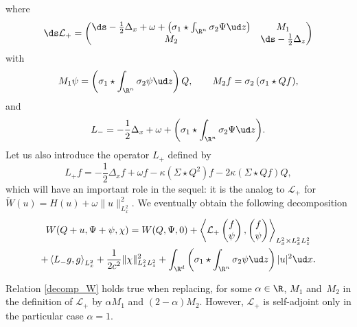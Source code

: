 where\vspace*{-3pt}
\begin{equation}\label{L+}
\ds \mathcal{L}_{+}=\begin{pmatrix} \ds-\frac{1}{2}\Delta_{x}+\omega+\left(\sigma_{1}\star\int_{\R^{n}}\sigma_{2}\Psi\ud z\right) & M_{1} \\ M_{2} & \ds-\frac{1}{2}\Delta_{z} \end{pmatrix}
\end{equation}
with\vspace*{-3pt}
\[
M_{1}\psi=\left(\sigma_{1}\star\int_{\R^{n}}\sigma_{2}\psi\ud z\right)Q, \qquad M_{2}f=\sigma_{2}\,(\sigma_{1}\star Qf),
\]
and\vspace*{-3pt}
\begin{equation}\label{L-}
L_{-}=-\frac{1}{2}\Delta_{x}+\omega+\biggl(\sigma_{1}\star\int_{\R^{n}}\sigma_{2}\Psi\ud z\biggr).
\end{equation}
Let us also introduce the operator $L_{+}$ defined by\vspace*{-3pt}
\begin{equation}\label{l+}
L_{+}f=-\frac{1}{2}\Delta_{x}f+\omega f-\kappa(\Sigma\star Q^{2})f-2\kappa(\Sigma\star Qf)Q,
\end{equation}
which will have an important role in the sequel: it is the analog to $\mathcal{L}_{+}$ for $\widetilde{W}(u)=H(u)+\omega\|u\|_{L_{x}^{2}}^{2}$.
We eventually obtain the following decomposition\vspace*{-5pt}
\begin{multline}\label{decomp_W}
W(Q+u,\Psi+\psi,\chi)=W(Q,\Psi,0)+\left\langle\mathcal{L}_{+}\begin{pmatrix} f\\\psi \end{pmatrix},\begin{pmatrix} f\\\psi \end{pmatrix}\right\rangle_{L_{x}^{2}\times L_{x}^{2}L_{z}^{2}}\\
+\left\langle L_{-}g,g\right\rangle_{L_{x}^{2}}
+\frac{1}{2c^{2}}\|\chi\|_{L_{x}^{2}L_{z}^{2}}^{2}+\int_{\R^{d}}\left(\sigma_{1}\star\int_{\R^{n}}\sigma_{2}\psi\ud z\right)|u|^{2}\ud x.
\end{multline}

\begin{rmk}
Relation \eqref{decomp_W} holds true when replacing, for some $\alpha\in\R$, $M_{1}$ and~$M_{2}$ in the definition of $\mathcal{L}_{+}$ by $\alpha M_{1}$ and $(2-\alpha)M_{2}$. However, $\mathcal{L}_{+}$ is self-adjoint only in the particular case $\alpha=1$.
\end{rmk}

